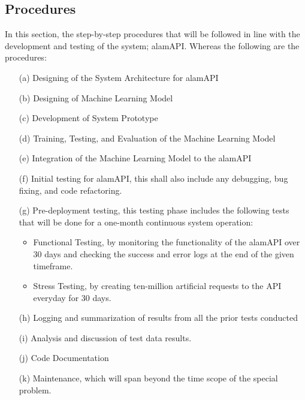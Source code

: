 \subsection{Procedures}
\label{subsec:procedures}
In this section, the step-by-step procedures that 
will be followed in line with the development and testing of the system; 
alamAPI. Whereas the following are the procedures:
\begin{itemize}
    \item[(a)]	Designing of the System Architecture for alamAPI
    \item[(b)]	Designing of Machine Learning Model
    \item[(c)]	Development of System Prototype
    \item[(d)]	Training, Testing, and Evaluation of the Machine Learning Model
    \item[(e)]	Integration of the Machine Learning Model to the alamAPI
    \item[(f)]	Initial testing for alamAPI, this shall also include any debugging, 
    bug fixing, and code refactoring.
    \item[(g)]	Pre-deployment testing, this testing phase includes the 
    following tests that will be done for a one-month continuous system operation:
        \begin{itemize}
            \item Functional Testing, by monitoring the functionality of 
            the alamAPI over 30 days and checking the success and error logs at 
            the end of the given timeframe.
            \item Stress Testing, by creating ten-million artificial requests 
            to the API everyday for 30 days.
        \end{itemize}
    \item[(h)]	Logging and summarization of results from all the prior 
    tests conducted
    \item[(i)]	Analysis and discussion of test data results.
    \item[(j)]	Code Documentation
    \item[(k)]	Maintenance, which will span beyond the time scope of the 
    special problem.
\end{itemize}